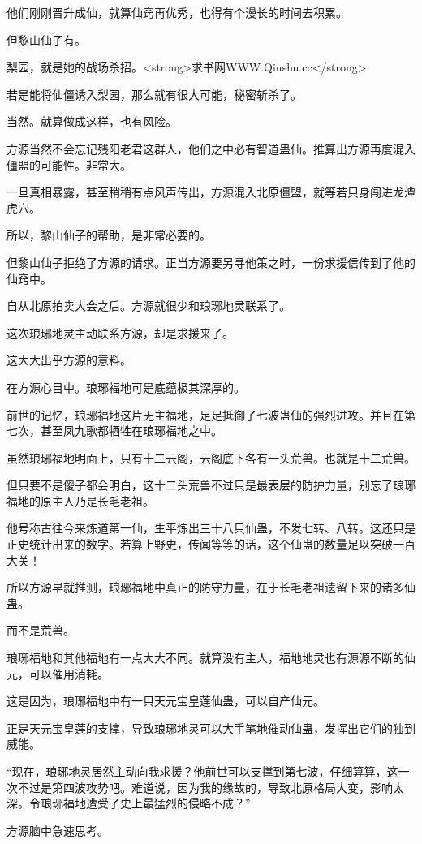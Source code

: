 \begin{this_body}
他们刚刚晋升成仙，就算仙窍再优秀，也得有个漫长的时间去积累。

但黎山仙子有。

梨园，就是她的战场杀招。<strong>求书网WWW.Qiushu.cc</strong>

若是能将仙僵诱入梨园，那么就有很大可能，秘密斩杀了。

当然。就算做成这样，也有风险。

方源当然不会忘记残阳老君这群人，他们之中必有智道蛊仙。推算出方源再度混入僵盟的可能性。非常大。

一旦真相暴露，甚至稍稍有点风声传出，方源混入北原僵盟，就等若只身闯进龙潭虎穴。

所以，黎山仙子的帮助，是非常必要的。

但黎山仙子拒绝了方源的请求。正当方源要另寻他策之时，一份求援信传到了他的仙窍中。

自从北原拍卖大会之后。方源就很少和琅琊地灵联系了。

这次琅琊地灵主动联系方源，却是求援来了。

这大大出乎方源的意料。

在方源心目中。琅琊福地可是底蕴极其深厚的。

前世的记忆，琅琊福地这片无主福地，足足抵御了七波蛊仙的强烈进攻。并且在第七次，甚至凤九歌都牺牲在琅琊福地之中。

虽然琅琊福地明面上，只有十二云阁，云阁底下各有一头荒兽。也就是十二荒兽。

但只要不是傻子都会明白，这十二头荒兽不过只是最表层的防护力量，别忘了琅琊福地的原主人乃是长毛老祖。

他号称古往今来炼道第一仙，生平炼出三十八只仙蛊，不发七转、八转。这还只是正史统计出来的数字。若算上野史，传闻等等的话，这个仙蛊的数量足以突破一百大关！

所以方源早就推测，琅琊福地中真正的防守力量，在于长毛老祖遗留下来的诸多仙蛊。

而不是荒兽。

琅琊福地和其他福地有一点大大不同。就算没有主人，福地地灵也有源源不断的仙元，可以催用消耗。

这是因为，琅琊福地中有一只天元宝皇莲仙蛊，可以自产仙元。

正是天元宝皇莲的支撑，导致琅琊地灵可以大手笔地催动仙蛊，发挥出它们的独到威能。

“现在，琅琊地灵居然主动向我求援？他前世可以支撑到第七波，仔细算算，这一次不过是第四波攻势吧。难道说，因为我的缘故的，导致北原格局大变，影响太深。令琅琊福地遭受了史上最猛烈的侵略不成？”

方源脑中急速思考。


\end{this_body}
